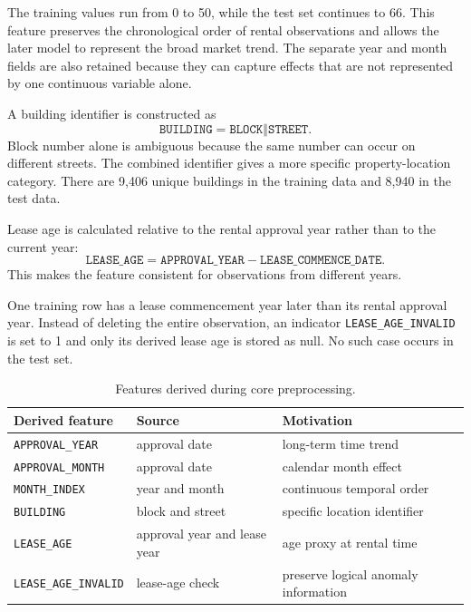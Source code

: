 \documentclass[10pt]{article}
\begin{document}
The training values run from 0 to 50, while the test set continues to 66.
This feature preserves the chronological order of rental observations and allows the later model to represent the broad market trend.
The separate year and month fields are also retained because they can capture effects that are not represented by one continuous variable alone.

A building identifier is constructed as
\begin{equation}
\texttt{BUILDING}
=
\texttt{BLOCK}
\mathbin{\Vert}
\texttt{STREET}.
\end{equation}
Block number alone is ambiguous because the same number can occur on different streets.
The combined identifier gives a more specific property-location category.
There are 9{,}406 unique buildings in the training data and 8{,}940 in the test data.

Lease age is calculated relative to the rental approval year rather than to the current year:
\begin{equation}
\texttt{LEASE\_AGE}
=
\texttt{APPROVAL\_YEAR}
-
\texttt{LEASE\_COMMENCE\_DATE}.
\end{equation}
This makes the feature consistent for observations from different years.

One training row has a lease commencement year later than its rental approval year.
Instead of deleting the entire observation, an indicator
\texttt{LEASE\_AGE\_INVALID} is set to 1 and only its derived lease age is stored as null.
No such case occurs in the test set.

\begin{table}[h]
\centering
\small
\begin{tabular}{lll}
\toprule
Derived feature & Source & Motivation \\
\midrule
\texttt{APPROVAL\_YEAR} & approval date & long-term time trend \\
\texttt{APPROVAL\_MONTH} & approval date & calendar month effect \\
\texttt{MONTH\_INDEX} & year and month & continuous temporal order \\
\texttt{BUILDING} & block and street & specific location identifier \\
\texttt{LEASE\_AGE} & approval year and lease year & age proxy at rental time \\
\texttt{LEASE\_AGE\_INVALID} & lease-age check & preserve logical anomaly information \\
\bottomrule
\end{tabular}
\caption{Features derived during core preprocessing.}
\label{tab:derived-core-features}
\end{table}
\end{document}
